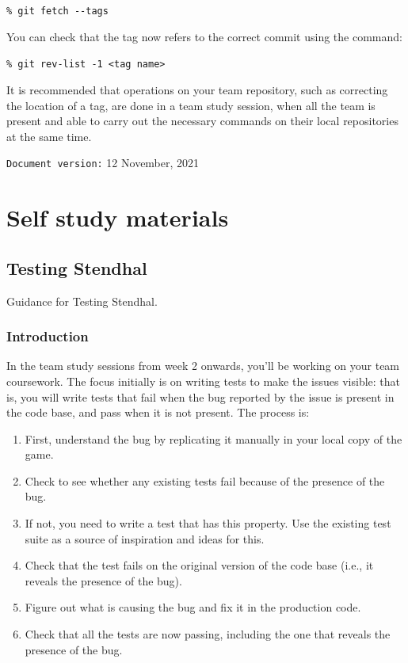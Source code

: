 \documentclass[
]{book}
\providecommand{\tightlist}{%
  \setlength{\itemsep}{0pt}\setlength{\parskip}{0pt}}
\begin{document}
\texttt{\%\ git\ fetch\ -\/-tags}

You can check that the tag now refers to the correct commit using the command:

\texttt{\%\ git\ rev-list\ -1\ \textless{}tag\ name\textgreater{}}

It is recommended that operations on your team repository, such as correcting the location of a tag, are done in a team study session, when all the team is present and able to carry out the necessary commands on their local repositories at the same time.

\texttt{Document\ version:} 12 November, 2021

\hypertarget{part-self-study-materials}{%
\part{Self study materials}\label{part-self-study-materials}}

\hypertarget{guiding}{%
\chapter{Testing Stendhal}\label{guiding}}

Guidance for Testing Stendhal.

\hypertarget{intros}{%
\section{Introduction}\label{intros}}

In the team study sessions from week 2 onwards, you'll be working on your team coursework. The focus initially is on writing tests to make the issues visible: that is, you will write tests that fail when the bug reported by the issue is present in the code base, and pass when it is not present. The process is:

\begin{enumerate}
\def\labelenumi{\arabic{enumi}.}
\tightlist
\item
  First, understand the bug by replicating it manually in your local copy of the game.
\item
  Check to see whether any existing tests fail because of the presence of the bug.
\item
  If not, you need to write a test that has this property. Use the existing test suite as a source of inspiration and ideas for this.
\item
  Check that the test fails on the original version of the code base (i.e., it reveals the presence of the bug).
\item
  Figure out what is causing the bug and fix it in the production code.
\item
  Check that all the tests are now passing, including the one that reveals the presence of the bug.
\end{enumerate}
\end{document}
